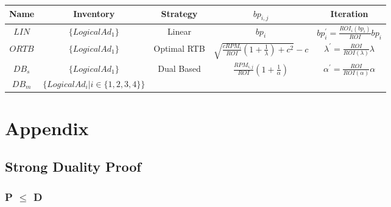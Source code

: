 \documentclass[sigconf]{acmart}
\newcommand{\sbp}{bp_{i,j}}
\newcommand{\sRPM}{RPM_{i,j}}
\newcommand{\ortbbp}{\sqrt{\frac{cRPM_i}{ROI}(1+\frac{1}{\lambda})+c^2}-c}
\newcommand{\dbbp}{\frac{\sRPM}{ROI}(1+\frac{1}{\alpha})}
\newcommand{\liniter}{bp_i^{'}=\frac{ROI_i(bp_i)}{ROI}bp_i}
\newcommand{\ortbiter}{\lambda^{'}=\frac{ROI}{ROI(\lambda)}\lambda}
\newcommand{\dbiter}{\alpha^{'} = \frac{ROI}{ROI(\alpha)}\alpha}
\begin{document}
\begin{center}
\begin{tabular}{|c|c|c|c|c|}
\hline
Name     & Inventory                           & Strategy                    & $\sbp$
    & Iteration \\
\hline
$LIN$    & $\{LogicalAd_1\}$                   & Linear                      & $bp_i$
    & $\liniter$ \\
\hline
$ORTB$   & $\{LogicalAd_1\}$                   & Optimal RTB                 & $\ortbbp$
    & $\ortbiter$ \\
\hline
$DB_{s}$ & $\{LogicalAd_1\}$                   & \multirow{2}{*}{Dual Based} & \multirow{2}{*}{$\dbbp$}
    & \multirow{2}{*}{$\dbiter$} \\
\cline{1-2}
$DB_{m}$ & $\{LogicalAd_i|i \in \{1,2,3,4\}\}$ &                             &
    & \\ 
\hline
\end{tabular}
\end{center}

\newpage
\section{Appendix}

\subsection{Strong Duality Proof}

\subsubsection{P $\le$ D}
\end{document}
